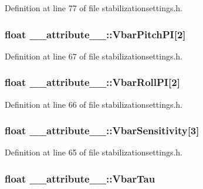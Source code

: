 \-Definition at line 77 of file stabilizationsettings.\-h.

\hypertarget{struct____attribute_____aa7f3567bc4df6b4a397bf5e0a8a86167}{
\subsubsection[{\-Vbar\-Pitch\-P\-I}]{\setlength{\rightskip}{0pt plus 5cm}float {\bf \-\_\-\-\_\-attribute\-\_\-\-\_\-\-::\-Vbar\-Pitch\-P\-I}\mbox{[}2\mbox{]}}}\label{struct____attribute_____aa7f3567bc4df6b4a397bf5e0a8a86167}


\-Definition at line 67 of file stabilizationsettings.\-h.

\hypertarget{struct____attribute_____a3fc980e1a43b064b1466305752290391}{
\subsubsection[{\-Vbar\-Roll\-P\-I}]{\setlength{\rightskip}{0pt plus 5cm}float {\bf \-\_\-\-\_\-attribute\-\_\-\-\_\-\-::\-Vbar\-Roll\-P\-I}\mbox{[}2\mbox{]}}}\label{struct____attribute_____a3fc980e1a43b064b1466305752290391}


\-Definition at line 66 of file stabilizationsettings.\-h.

\hypertarget{struct____attribute_____a5b6cb90c9975edb510ddcc9815ffb176}{
\subsubsection[{\-Vbar\-Sensitivity}]{\setlength{\rightskip}{0pt plus 5cm}float {\bf \-\_\-\-\_\-attribute\-\_\-\-\_\-\-::\-Vbar\-Sensitivity}\mbox{[}3\mbox{]}}}\label{struct____attribute_____a5b6cb90c9975edb510ddcc9815ffb176}


\-Definition at line 65 of file stabilizationsettings.\-h.

\hypertarget{struct____attribute_____a159dee9efc9ee57d4f21c00a743a0423}{
\subsubsection[{\-Vbar\-Tau}]{\setlength{\rightskip}{0pt plus 5cm}float {\bf \-\_\-\-\_\-attribute\-\_\-\-\_\-\-::\-Vbar\-Tau}}}\label{struct____attribute_____a159dee9efc9ee57d4f21c00a743a0423}


